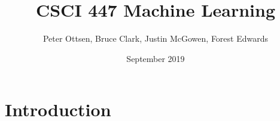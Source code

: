 \documentclass{article}
\title{CSCI 447 Machine Learning}
\author{Peter Ottsen, Bruce Clark, Justin McGowen, Forest Edwards}
\date{September 2019}
\begin{document}
\maketitle

\section{Introduction}
\end{document}
